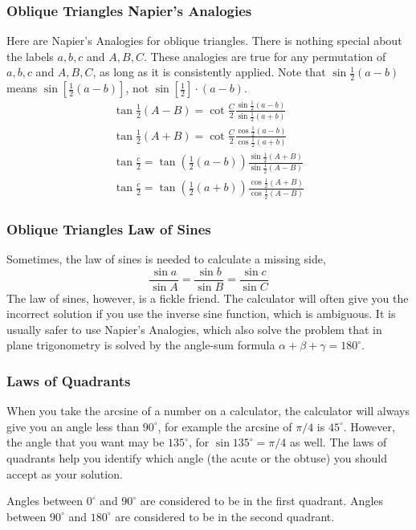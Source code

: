 \documentclass[xcolor=dvipsnames]{beamer}
\begin{document}
\begin{frame}
  \frametitle{Oblique Triangles Napier's Analogies}
Here are Napier's Analogies for oblique triangles. There is nothing
special about the labels $a,b,c$ and $A,B,C$. These analogies are true
for any permutation of $a,b,c$ and $A,B,C$, as long as it is
consistently applied. Note that $\sin\frac{1}{2}(a-b)$ means
$\sin[\frac{1}{2}(a-b)]$, not $\sin[\frac{1}{2}]\cdot{}(a-b)$.
\begin{equation}
  \label{eq:uteseivu}
  \begin{array}{l}
    \tan\frac{1}{2}(A-B)=\cot\frac{C}{2}\frac{\sin\frac{1}{2}(a-b)}{\sin\frac{1}{2}(a+b)} \\
    \tan\frac{1}{2}(A+B)=\cot\frac{C}{2}\frac{\cos\frac{1}{2}(a-b)}{\cos\frac{1}{2}(a+b)} \\
    \tan\frac{c}{2}=\tan\left(\frac{1}{2}(a-b)\right)\frac{\sin\frac{1}{2}(A+B)}{\sin\frac{1}{2}(A-B)} \\
    \tan\frac{c}{2}=\tan\left(\frac{1}{2}(a+b)\right)\frac{\cos\frac{1}{2}(A+B)}{\cos\frac{1}{2}(A-B)}
  \end{array}
\end{equation}
\end{frame}

\begin{frame}
  \frametitle{Oblique Triangles Law of Sines}
Sometimes, the law of sines is needed to calculate a missing side,
\begin{equation}
  \label{eq:aebaeyun}
  \frac{\sin{}a}{\sin{}A}=\frac{\sin{}b}{\sin{}B}=\frac{\sin{}c}{\sin{}C}
\end{equation}
The law of sines, however, is a fickle friend. The calculator will
often give you the incorrect solution if you use the inverse sine
function, which is ambiguous. It is usually safer to use Napier's
Analogies, which also solve the problem that in plane trigonometry is
solved by the angle-sum formula $\alpha+\beta+\gamma=180^{\circ}$.
\end{frame}

\begin{frame}
  \frametitle{Laws of Quadrants}
When you take the arcsine of a number on a calculator, the calculator
will always give you an angle less than $90^{\circ}$, for example the
arcsine of $\pi/4$ is $45^{\circ}$. However, the angle that you want
may be $135^{\circ}$, for $\sin{}135^{\circ}=\pi/4$ as well. The laws
of quadrants help you identify which angle (the acute or the obtuse)
you should accept as your solution.

\bigskip

Angles between $0^{\circ}$ and $90^{\circ}$ are considered to be in
the first quadrant. Angles between $90^{\circ}$ and $180^{\circ}$ are
considered to be in the second quadrant.
\end{frame}
\end{document}
